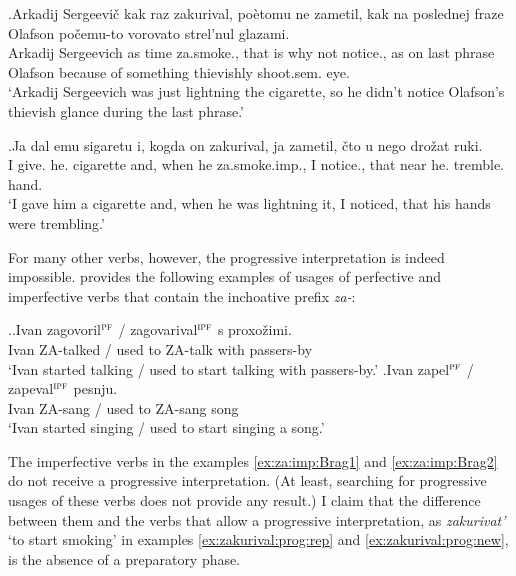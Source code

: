 \exg.\label{ex:zakurival:prog:rep}Arkadij Sergeevi\v{c} kak raz zakurival, po\`{e}tomu ne zametil, kak na poslednej fraze Olafson po\v{c}emu-to vorovato strel'nul glazami.\\
Arkadij Sergeevich as time za.smoke., {that is why} not notice., as on last phrase Olafson {because of something} thievishly shoot.sem. eye.\\
\trans `Arkadij Sergeevich was just lightning the cigarette, so he didn't notice Olafson's thievish glance during the last phrase.'

\exg.\label{ex:zakurival:prog:new}Ja dal emu sigaretu i, kogda on zakurival, ja zametil, \v{c}to u nego dro\v{z}at ruki.\\
I give. he. cigarette and, when he za.smoke.imp., I notice., that near he. tremble. hand.\\
\trans `I gave him a cigarette and, when he was lightning it, I noticed, that his hands were trembling.'\\

For many other verbs, however, the progressive interpretation is indeed impossible. \citet{Braginsky:08} provides the following examples of usages of perfective and imperfective verbs that contain the inchoative prefix \textit{za-}:

\ex.\label{ex:za:imp:Brag}\ag.\label{ex:za:imp:Brag1}Ivan zagovoril$^{\textsc{pf}}$ / zagovarival$^{\textsc{ipf}}$ s proxo\v{z}imi.\\
Ivan ZA-talked / {used to ZA-talk} with passers-by\\
\trans `Ivan started talking / used to start talking with passers-by.'
\bg.\label{ex:za:imp:Brag2}Ivan zapel$^{\textsc{pf}}$ / zapeval$^{\textsc{ipf}}$ pesnju.\\
Ivan ZA-sang / {used to ZA-sang} song\\
\trans `Ivan started singing / used to start singing a song.'\\

The imperfective verbs in the examples \ref{ex:za:imp:Brag1} and \ref{ex:za:imp:Brag2} do not receive a progressive interpretation. (At least, searching for progressive usages of these verbs does not provide any result.) I claim that the difference between them and the verbs that allow a progressive interpretation, as \textit{zakurivat'} `to start smoking' in examples \ref{ex:zakurival:prog:rep} and \ref{ex:zakurival:prog:new}, is the absence of a preparatory phase. 

